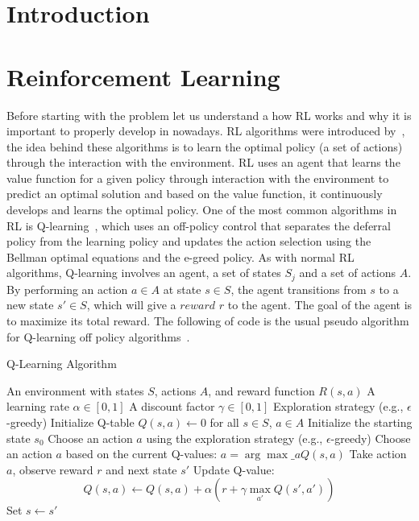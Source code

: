 
\section{Introduction}
\label{sec:problem}

\section{Reinforcement Learning}

Before starting with the problem let us understand a how \ac{RL} works and why it is  
important to properly develop in nowadays.
\ac{RL} algorithms were introduced by~\citet{sutton98}, the idea behind these 
algorithms is to learn the optimal policy (a set of actions) through the interaction 
with the environment. \ac{RL} uses an agent that learns the value function for a given policy 
through interaction with the environment to predict an optimal solution and based on the value 
function, it continuously develops and learns the optimal policy. One of the most common algorithms
in \ac{RL} is Q-learning~\cite{8836506}, which uses an off-policy control that separates the deferral 
policy from the learning policy and updates the action selection using the Bellman optimal equations
and the e-greed policy. As with normal \ac{RL} algorithms, Q-learning involves an agent, a set of states
$S_j$ and a set of actions $A$. By performing an action $a\in A$ at state $s \in S$, the agent 
transitions from $s$ to a new state $s' \in S$, which will give a $reward$ $r$ to the agent. 
The goal of the agent is to maximize its 
total reward. The following  
of code is the usual pseudo algorithm for 
Q-learning off policy algorithms~\cite{Sutton1998}.

\begin{algorithm}
\caption{Q-Learning Algorithm}\label{lst:qlearning}
\begin{algorithmic}
\Require An environment with states $S$, actions $A$, and reward function $R(s, a)$
\Require A learning rate $\alpha \in [0, 1]$
\Require A discount factor $\gamma \in [0, 1]$
\Require Exploration strategy (e.g., $\epsilon$-greedy)
\State Initialize Q-table $Q(s, a) \gets 0$ for all $s \in S$, $a \in A$
    \State Initialize the starting state $s_0$
            \State Choose an action $a$ using the exploration strategy (e.g., $\epsilon$-greedy)
        \Else
            \State Choose an action $a$ based on the current Q-values: $a = \arg\max\_a Q(s, a)$
        \EndIf
        \State Take action $a$, observe reward $r$ and next state $s'$
        \State Update Q-value: 
        \[
        Q(s, a) \gets Q(s, a) + \alpha \left( r + \gamma \max_{a'} Q(s', a')\right)
        \]
        \State Set $s \gets s'$
    \EndFor
\EndFor
\end{algorithmic}
\end{algorithm}

